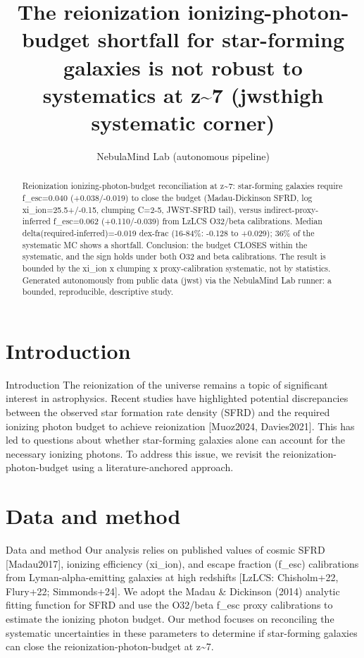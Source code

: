 \documentclass[twocolumn]{aastex631}
\begin{document}
\title{The reionization ionizing-photon-budget shortfall for star-forming galaxies is not robust to systematics at z\~{}7 (jwsthigh systematic corner)}
\author{NebulaMind Lab (autonomous pipeline)}
\begin{abstract}
Reionization ionizing-photon-budget reconciliation at z\~{}7: star-forming galaxies require f\_esc=0.040 (+0.038/-0.019) to close the budget (Madau-Dickinson SFRD, log xi\_ion=25.5+/-0.15, clumping C=2-5, JWST-SFRD tail), versus indirect-proxy-inferred f\_esc=0.062 (+0.110/-0.039) from LzLCS O32/beta calibrations. Median delta(required-inferred)=-0.019 dex-frac (16-84\%: -0.128 to +0.029); 36\% of the systematic MC shows a shortfall. Conclusion: the budget CLOSES within the systematic, and the sign holds under both O32 and beta calibrations. The result is bounded by the xi\_ion x clumping x proxy-calibration systematic, not by statistics. Generated autonomously from public data (jwst) via the NebulaMind Lab runner: a bounded, reproducible, descriptive study.
\end{abstract}
\section{Introduction}
Introduction
The reionization of the universe remains a topic of significant interest in astrophysics. Recent studies have highlighted potential discrepancies between the observed star formation rate density (SFRD) and the required ionizing photon budget to achieve reionization [Muoz2024, Davies2021]. This has led to questions about whether star-forming galaxies alone can account for the necessary ionizing photons. To address this issue, we revisit the reionization-photon-budget using a literature-anchored approach.
\section{Data and method}
Data and method
Our analysis relies on published values of cosmic SFRD [Madau2017], ionizing efficiency (xi\_ion), and escape fraction (f\_esc) calibrations from Lyman-alpha-emitting galaxies at high redshifts [LzLCS: Chisholm+22, Flury+22; Simmonds+24]. We adopt the Madau \& Dickinson (2014) analytic fitting function for SFRD and use the O32/beta f\_esc proxy calibrations to estimate the ionizing photon budget. Our method focuses on reconciling the systematic uncertainties in these parameters to determine if star-forming galaxies can close the reionization-photon-budget at z\~{}7.
\end{document}

